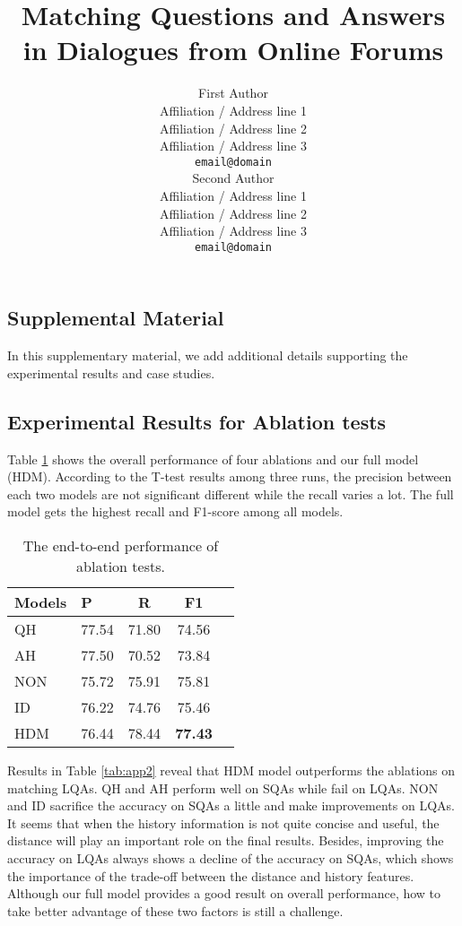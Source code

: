 \documentclass[11pt,a4paper]{article}
\title{Matching Questions and Answers in Dialogues from Online Forums}
\author{First Author \\
	Affiliation / Address line 1 \\
	Affiliation / Address line 2 \\
	Affiliation / Address line 3 \\
	{\tt email@domain} \\\And
	Second Author \\
	Affiliation / Address line 1 \\
	Affiliation / Address line 2 \\
	Affiliation / Address line 3 \\
	{\tt email@domain} \\}
\date{}
\begin{document}
	\maketitle
\begin{CJK}{UTF8}{gbsn}
\section{Supplemental Material}
\label{sec:appendix}

In this supplementary material, we add additional details supporting the experimental results and case studies.

\subsection{Experimental Results for Ablation tests}

Table \ref{tab:app1} shows the overall performance of four ablations and our full model (HDM). According to the T-test results among three runs, the precision between each two models are not significant different while the recall varies a lot. The full model gets the highest recall and F1-score among all models.

\begin{table}[h]
	\small
	\centering
	\begin{tabular}{p{1cm}<{\centering}p{1cm}<{\centering}ccc}
		\toprule[1.5pt]
		Models &P&R& F1\\
		\midrule[1pt]
		QH&77.54&71.80&74.56\\
		AH&77.50&70.52&73.84\\
		\hline
		NON&75.72&75.91&75.81\\
		ID&76.22&74.76&75.46\\
		\hline
		HDM&76.44&78.44&\textbf{77.43}\\
		\bottomrule[1.5pt]
	\end{tabular}
	\caption{The end-to-end performance of ablation tests.}
	\label{tab:app1}
\end{table}

Results in Table \ref{tab:app2} reveal that HDM model outperforms the ablations on matching LQAs. QH and AH perform well on SQAs while fail on LQAs. NON and ID sacrifice the accuracy on SQAs a little and make improvements on LQAs. It seems that when the history information is not quite concise and useful, the distance will play an important role on the final results. Besides, improving the accuracy on LQAs always shows a decline of the accuracy on SQAs, which shows the importance of the trade-off between the distance and history features. Although our full model provides a good result on overall performance, how to take better advantage of these two factors is still a challenge.



\end{CJK}
\end{document}
